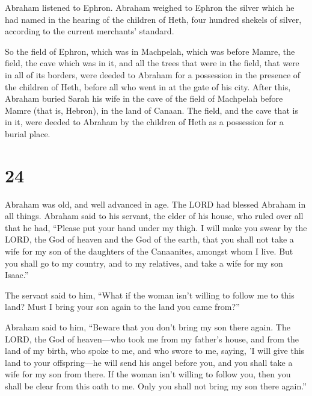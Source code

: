  Abraham listened to Ephron. Abraham weighed to Ephron
the silver which he had named in the hearing of the children of Heth,
four hundred shekels of silver, according to the current merchants'
standard.

 So the field of Ephron, which was in Machpelah, which
was before Mamre, the field, the cave which was in it, and all the trees
that were in the field, that were in all of its borders, were deeded
 to Abraham for a possession in the presence of the
children of Heth, before all who went in at the gate of his city.
 After this, Abraham buried Sarah his wife in the cave of
the field of Machpelah before Mamre (that is, Hebron), in the land of
Canaan.  The field, and the cave that is in it, were
deeded to Abraham by the children of Heth as a possession for a burial
place.

\hypertarget{section-23}{%
\section{24}\label{section-23}}

 Abraham was old, and well advanced in age. The LORD had
blessed Abraham in all things.  Abraham said to his
servant, the elder of his house, who ruled over all that he had,
``Please put your hand under my thigh.  I will make you
swear by the LORD, the God of heaven and the God of the earth, that you
shall not take a wife for my son of the daughters of the Canaanites,
amongst whom I live.  But you shall go to my country, and
to my relatives, and take a wife for my son Isaac.''

 The servant said to him, ``What if the woman isn't
willing to follow me to this land? Must I bring your son again to the
land you came from?''

 Abraham said to him, ``Beware that you don't bring my son
there again.  The LORD, the God of heaven---who took me
from my father's house, and from the land of my birth, who spoke to me,
and who swore to me, saying, 'I will give this land to your
offspring---he will send his angel before you, and you shall take a wife
for my son from there.  If the woman isn't willing to
follow you, then you shall be clear from this oath to me. Only you shall
not bring my son there again.''

